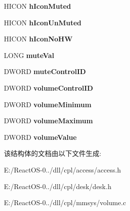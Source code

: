 \begin{DoxyCompactItemize}
H\+I\+C\+ON {\bfseries h\+Icon\+Muted}
\item 
\mbox{\label{struct___g_l_o_b_a_l___d_a_t_a_ad3479eb23b5a0dbe08a20f4ed5ce6a34}} 
H\+I\+C\+ON {\bfseries h\+Icon\+Un\+Muted}
\item 
\mbox{\label{struct___g_l_o_b_a_l___d_a_t_a_a609e9f557b39e72d1fae30bb21e930c6}} 
H\+I\+C\+ON {\bfseries h\+Icon\+No\+HW}
\item 
\mbox{\label{struct___g_l_o_b_a_l___d_a_t_a_a7be9078219348cfadf09ef8357a56bd8}} 
L\+O\+NG {\bfseries mute\+Val}
\item 
\mbox{\label{struct___g_l_o_b_a_l___d_a_t_a_ae77e57bf4b798c148de2b3010ede76ae}} 
D\+W\+O\+RD {\bfseries mute\+Control\+ID}
\item 
\mbox{\label{struct___g_l_o_b_a_l___d_a_t_a_af3431035573be0b88d5361b65166a82e}} 
D\+W\+O\+RD {\bfseries volume\+Control\+ID}
\item 
\mbox{\label{struct___g_l_o_b_a_l___d_a_t_a_adf92ef12985df4e1f59afd03156aeac5}} 
D\+W\+O\+RD {\bfseries volume\+Minimum}
\item 
\mbox{\label{struct___g_l_o_b_a_l___d_a_t_a_a7b00c4d5b199781e41465f5a673d1f4a}} 
D\+W\+O\+RD {\bfseries volume\+Maximum}
\item 
\mbox{\label{struct___g_l_o_b_a_l___d_a_t_a_abbec1bad97e7518dc8f2cea69b851e92}} 
D\+W\+O\+RD {\bfseries volume\+Value}
\end{DoxyCompactItemize}


该结构体的文档由以下文件生成\+:\begin{DoxyCompactItemize}
\item 
E\+:/\+React\+O\+S-\/0../dll/cpl/access/access.\+h\item 
E\+:/\+React\+O\+S-\/0../dll/cpl/desk/desk.\+h\item 
E\+:/\+React\+O\+S-\/0../dll/cpl/mmsys/volume.\+c\end{DoxyCompactItemize}
